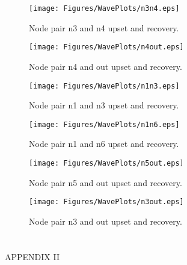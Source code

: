\begin{figure}[!htbp]
	\centering
	\texttt{[image: Figures/WavePlots/n3n4.eps]}
	\caption{Node pair n3 and n4 upset and recovery.}
	\label{fig:n3n4}
\end{figure}

\begin{figure}[!htbp]
	\centering
	\texttt{[image: Figures/WavePlots/n4out.eps]}
	\caption{Node pair n4 and out upset and recovery.}
	\label{fig:n4out}
\end{figure}

\begin{figure}[!htbp]
	\centering
	\texttt{[image: Figures/WavePlots/n1n3.eps]}
	\caption{Node pair n1 and n3 upset and recovery.}
	\label{fig:n1n3}
\end{figure}

\begin{figure}[!htbp]
	\centering
	\texttt{[image: Figures/WavePlots/n1n6.eps]}
	\caption{Node pair n1 and n6 upset and recovery.}
	\label{fig:n1n6}
\end{figure}

\begin{figure}[!htbp]
	\centering
	\texttt{[image: Figures/WavePlots/n5out.eps]}
	\caption{Node pair n5 and out upset and recovery.}
	\label{fig:n3out}
\end{figure}

\begin{figure}
	\centering
	\texttt{[image: Figures/WavePlots/n3out.eps]}
	\caption{Node pair n3 and out upset and recovery.}
	\label{fig:n5n6}
\end{figure}


\chapter*{}
\begin{center}
APPENDIX II
\end{center}
